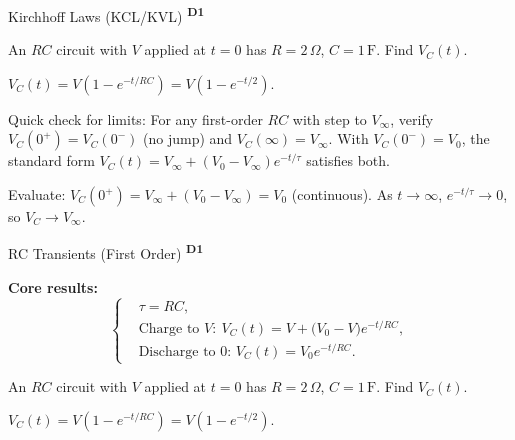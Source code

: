 ﻿\documentclass[12pt,a4paper]{article}
\providecommand{\KPFormulas}{}
\providecommand{\KPProblems}{}
\newcommand{\DOne}{\texorpdfstring{\textsuperscript{\textbf{D1}}}{ D1}}
\begin{document}
\begin{KnowledgePoint}{Kirchhoff Laws (KCL/KVL) \DOne}
  \KPProblems
  \begin{cheatproblem}
  An $RC$ circuit with $V$ applied at $t=0$ has $R=2\,\Omega$, $C=1\,\text{F}$. Find $V_C(t)$.
  \begin{solutionbox}
  $V_C(t)=V(1-e^{-t/RC})=V(1-e^{-t/2})$.
  \end{solutionbox}
  \end{cheatproblem}
\begin{cheatproblem}
  Quick check for limits: For any first-order $RC$ with step to $V_\infty$, verify $V_C(0^+)=V_C(0^-)$ (no jump) and $V_C(\infty)=V_\infty$. With $V_C(0^-)=V_0$, the standard form $V_C(t)=V_\infty+(V_0-V_\infty)e^{-t/\tau}$ satisfies both.
  \begin{solutionbox}
    Evaluate: $V_C(0^+)=V_\infty+(V_0-V_\infty)=V_0$ (continuous). As $t\to\infty$, $e^{-t/\tau}\to0$, so $V_C\to V_\infty$.
  \end{solutionbox}
\end{cheatproblem}
\end{KnowledgePoint}

\begin{KnowledgePoint}{RC Transients (First Order) \DOne}
  \KPFormulas
  \begin{formulabox}
  \textbf{Core results:}
  \[
  \left\{\begin{aligned}
    &\tau=RC,\\
    &\text{Charge to }V:\ V_C(t)=V+\big(V_0-V\big)e^{-t/RC},\\
    &\text{Discharge to 0: } V_C(t)=V_0 e^{-t/RC}.
  \end{aligned}\right.
  \]
  \end{formulabox}

  \KPProblems
  \begin{cheatproblem}
  An $RC$ circuit with $V$ applied at $t=0$ has $R=2\,\Omega$, $C=1\,\text{F}$. Find $V_C(t)$.
  \begin{solutionbox}
  $V_C(t)=V(1-e^{-t/RC})=V(1-e^{-t/2}).$
  \end{solutionbox}
  \end{cheatproblem}
\end{KnowledgePoint}


\end{document}

